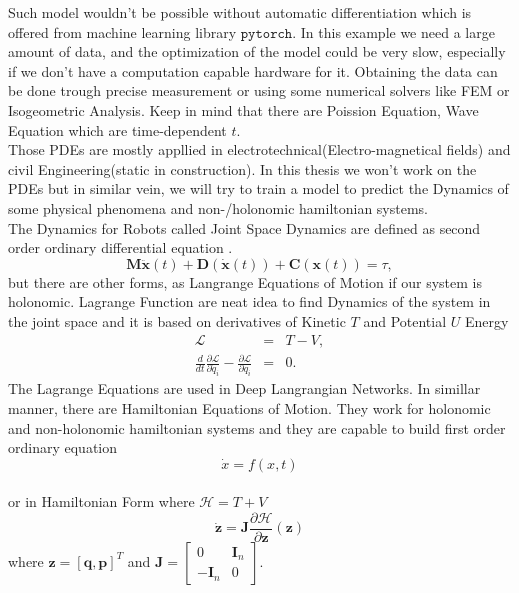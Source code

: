 Such model wouldn't be possible without automatic differentiation\cite{autodiff} which is offered from machine learning library $\texttt{pytorch}$\cite{pytorch}. In this example we need a large amount of data, and the optimization of the model could be very slow, especially if we don't have a computation capable hardware for it. Obtaining the data can be done trough precise measurement or using some numerical solvers like FEM\cite{fem} or Isogeometric Analysis\cite{iga}. Keep in mind that there are Poission Equation, Wave Equation which are time-dependent $t$.\\
Those PDEs are mostly appllied in electrotechnical(Electro-magnetical fields) and  civil Engineering(static in construction).
In this thesis we won't work on the PDEs but in similar vein, we will try to train a model to predict the Dynamics of some physical phenomena and non-/holonomic hamiltonian systems.\\
The Dynamics for Robots called Joint Space Dynamics are defined as second order ordinary differential equation\cite{jointspace} .
\begin{equation}
	\mathbf{M}\ddot{\mathbf{x}}(t) + \mathbf{D}(\dot{\mathbf{x}}(t)) + \mathbf{C}(\mathbf{x}(t))=\tau,
\end{equation} but there are other forms, as Langrange Equations of Motion if our system is holonomic\cite{holo}. Lagrange Function are neat idea to find Dynamics of the system in the joint space and it is  based on derivatives of Kinetic $T$ and Potential $U$ Energy
\begin{eqnarray}
	\mathcal{L} &=& T - V,\\
	\frac{d}{dt}\frac{\partial \mathcal{L}}{\partial \dot{q}_i} - \frac{\partial \mathcal{L}}{\partial q_i}&=&0.
\end{eqnarray}   
The Lagrange Equations are used in Deep Langrangian Networks\cite{delan}. In simillar manner, there are Hamiltonian Equations of Motion.
They work for holonomic and non-holonomic hamiltonian systems and they are capable to build first order ordinary equation
\begin{equation}
	\dot{x} = f(x,t)
\end{equation} \\
or in Hamiltonian Form where $\mathcal{H} = T + V$
\begin{equation}
	\dot{\mathbf{z}} = \mathbf{J}\frac{\partial\mathcal{H}}{\partial \mathbf{z}}(\mathbf{z})
\end{equation} where $\mathbf{z}=[\mathbf{q},\mathbf{p}]^T$ and $\mathbf{J} = \begin{bmatrix}
0 & \mathbf{I}_n\\
-\mathbf{I}_n & 0
\end{bmatrix}. $\\
